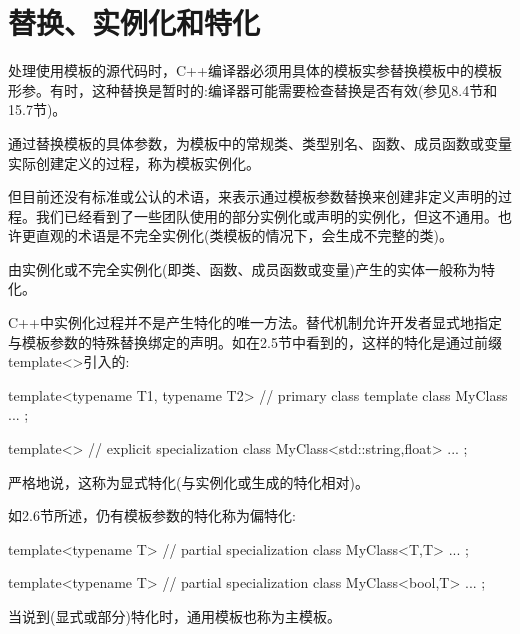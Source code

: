 \section{替换、实例化和特化}
处理使用模板的源代码时，C++编译器必须用具体的模板实参替换模板中的模板形参。有时，这种替换是暂时的:编译器可能需要检查替换是否有效(参见8.4节和15.7节)。

通过替换模板的具体参数，为模板中的常规类、类型别名、函数、成员函数或变量实际创建定义的过程，称为模板实例化。

但目前还没有标准或公认的术语，来表示通过模板参数替换来创建非定义声明的过程。我们已经看到了一些团队使用的部分实例化或声明的实例化，但这不通用。也许更直观的术语是不完全实例化(类模板的情况下，会生成不完整的类)。

由实例化或不完全实例化(即类、函数、成员函数或变量)产生的实体一般称为特化。

C++中实例化过程并不是产生特化的唯一方法。替代机制允许开发者显式地指定与模板参数的特殊替换绑定的声明。如在2.5节中看到的，这样的特化是通过前缀template<>引入的:

\begin{cpp}
template<typename T1, typename T2> // primary class template
class MyClass {
  ...
};

template<> // explicit specialization
class MyClass<std::string,float> {
  ...
};
\end{cpp}

严格地说，这称为显式特化(与实例化或生成的特化相对)。

如2.6节所述，仍有模板参数的特化称为偏特化:

\begin{cpp}
template<typename T> // partial specialization
class MyClass<T,T> {
  ...
};

template<typename T> // partial specialization
class MyClass<bool,T> {
  ...
};
\end{cpp}

当说到(显式或部分)特化时，通用模板也称为主模板。
